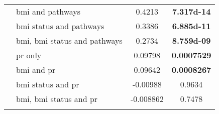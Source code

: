 \begin{ThreePartTable}
\begin{longtable}{llcc}
		                                  & \gls{bmi} and pathways                   & 0.4213     & \bfseries \num{7.317d-14} \\
		                                  & \gls{bmi} status and pathways            & 0.3386     & \bfseries \num{6.885d-11} \\
		                                  & \gls{bmi}, \gls{bmi} status and pathways & 0.2734     & \bfseries \num{8.759d-09} \\
		                                  & \gls{pr} only                            & 0.09798    & \bfseries 0.0007529 \\
		                                  & \gls{bmi} and \gls{pr}                   & 0.09642    & \bfseries 0.0008267 \\
		                                  & \gls{bmi} status and \gls{pr}            & -0.00988   & 0.9634    \\
		                                  & \gls{bmi}, \gls{bmi} status and \gls{pr} & -0.008862  & 0.7478    \\
				\hline
				\hline
				\insertTableNotes
			\end{longtable}
	\end{ThreePartTable}

